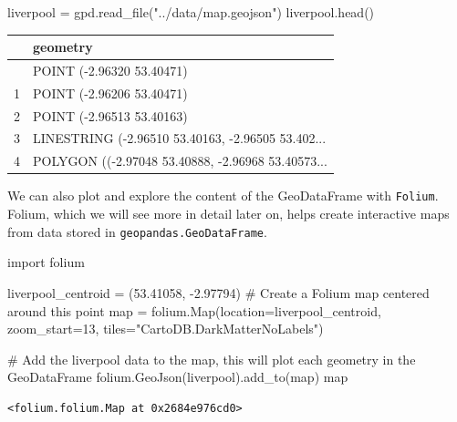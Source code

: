 \documentclass[
  letterpaper,
  DIV=11,
  numbers=noendperiod]{scrreprt}
\newenvironment{Shaded}{\begin{snugshade}}{\end{snugshade}}
\newcommand{\BuiltInTok}[1]{\textcolor[rgb]{0.00,0.23,0.31}{#1}}
\newcommand{\CommentTok}[1]{\textcolor[rgb]{0.37,0.37,0.37}{#1}}
\newcommand{\DecValTok}[1]{\textcolor[rgb]{0.68,0.00,0.00}{#1}}
\newcommand{\FloatTok}[1]{\textcolor[rgb]{0.68,0.00,0.00}{#1}}
\newcommand{\ImportTok}[1]{\textcolor[rgb]{0.00,0.46,0.62}{#1}}
\newcommand{\NormalTok}[1]{\textcolor[rgb]{0.00,0.23,0.31}{#1}}
\newcommand{\OperatorTok}[1]{\textcolor[rgb]{0.37,0.37,0.37}{#1}}
\newcommand{\StringTok}[1]{\textcolor[rgb]{0.13,0.47,0.30}{#1}}
\begin{document}
\begin{Shaded}
\begin{Highlighting}[]
\NormalTok{liverpool }\OperatorTok{=}\NormalTok{ gpd.read\_file(}\StringTok{"../data/map.geojson"}\NormalTok{)}
\NormalTok{liverpool.head()}
\end{Highlighting}
\end{Shaded}

\begin{longtable}[]{@{}ll@{}}
\toprule\noalign{}
& geometry \\
\midrule\noalign{}
\endhead
\bottomrule\noalign{}
\endlastfoot
0 & POINT (-2.96320 53.40471) \\
1 & POINT (-2.96206 53.40471) \\
2 & POINT (-2.96513 53.40163) \\
3 & LINESTRING (-2.96510 53.40163, -2.96505 53.402... \\
4 & POLYGON ((-2.97048 53.40888, -2.96968 53.40573... \\
\end{longtable}

We can also plot and explore the content of the GeoDataFrame with
\texttt{Folium}. Folium, which we will see more in detail later on,
helps create interactive maps from data stored in
\texttt{geopandas.GeoDataFrame}.

\begin{Shaded}
\begin{Highlighting}[]
\ImportTok{import}\NormalTok{ folium }

\NormalTok{liverpool\_centroid }\OperatorTok{=}\NormalTok{ (}\FloatTok{53.41058}\NormalTok{, }\OperatorTok{{-}}\FloatTok{2.97794}\NormalTok{)}
\CommentTok{\# Create a Folium map centered around this point}
\BuiltInTok{map} \OperatorTok{=}\NormalTok{ folium.Map(location}\OperatorTok{=}\NormalTok{liverpool\_centroid, zoom\_start}\OperatorTok{=}\DecValTok{13}\NormalTok{, tiles}\OperatorTok{=}\StringTok{"CartoDB.DarkMatterNoLabels"}\NormalTok{)}

\CommentTok{\# Add the liverpool data to the map, this will plot each geometry in the GeoDataFrame}
\NormalTok{folium.GeoJson(liverpool).add\_to(}\BuiltInTok{map}\NormalTok{)}
\BuiltInTok{map}
\end{Highlighting}
\end{Shaded}

\begin{verbatim}
<folium.folium.Map at 0x2684e976cd0>
\end{verbatim}
\end{document}
